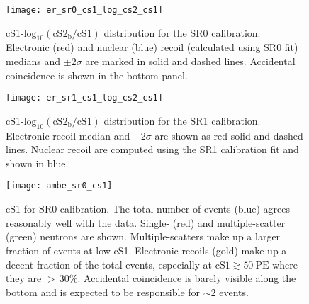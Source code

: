 \begin{figure}
\centering
\texttt{[image: er\_sr0\_cs1\_log\_cs2\_cs1]}
\caption[cS1-$\mathrm{log}_{10}(\mathrm{cS2_b / cS1})$ distribution for the SR0  calibration.  Electronic
and nuclear recoil medians and $\pm 2\sigma$ are marked in solid and dashed
lines.  Accidental coincidence is shown in the bottom panel.]{cS1-$\mathrm{log}_{10}(\mathrm{cS2_b / cS1})$ distribution for the SR0
 calibration.  Electronic (red)
and nuclear (blue) recoil (calculated using SR0  fit) medians and $\pm 2\sigma$ are marked in solid and dashed
lines.  Accidental coincidence is shown in the bottom panel.}
\label{fig:er_nr_calibrations_results_er_sr0_cs1_log_cs2_cs1}
\end{figure}

\begin{figure}
\centering
\texttt{[image: er\_sr1\_cs1\_log\_cs2\_cs1]}
\caption[cS1-$\mathrm{log}_{10}(\mathrm{cS2_b / cS1})$ distribution for the SR1  calibration.  Electronic
and nuclear recoil medians and $\pm 2\sigma$ are marked in solid and dashed
lines.  Accidental coincidence is shown in the bottom panel.]{cS1-$\mathrm{log}_{10}(\mathrm{cS2_b / cS1})$ distribution for the SR1
 calibration.  Electronic recoil
median and $\pm 2\sigma$ are shown as red solid and dashed lines.  Nuclear recoil are computed using the SR1 \ambe calibration fit and
shown in blue.}
\label{fig:er_nr_calibrations_results_er_sr1_cs1_log_cs2_cs1}
\end{figure}

\begin{figure}
\centering
\texttt{[image: ambe\_sr0\_cs1]}
\caption[cS1 for SR0 \ambe calibration.  The total number of events agrees reasonably well with the data.  Single- and
multiple-scatter neutrons, electronic recoils, and AC are shown.]{cS1 for SR0 \ambe calibration.  The total number of events (blue) agrees
reasonably well with the data.  Single- (red) and
multiple-scatter (green) neutrons are shown.  Multiple-scatters make up a larger fraction of events
at low cS1.  Electronic recoils (gold) make up a decent fraction of the total events, especially at $\mathrm{cS1} \gtrsim 50\ \mathrm{PE}$
where they are ${>}\, 30\%$.  Accidental coincidence is barely visible along the bottom and is expected to be responsible for ${\sim}2$
events.}
\label{fig:er_nr_calibrations_results_ambe_sr0_cs1}
\end{figure}

